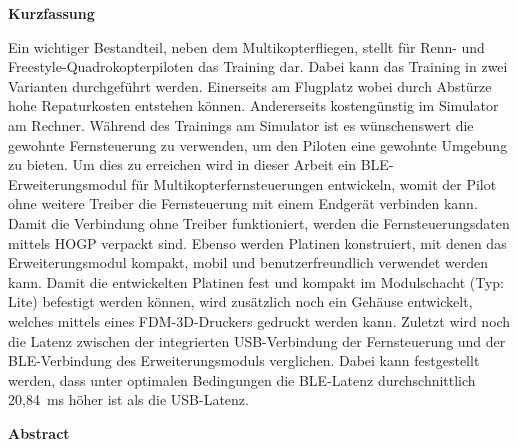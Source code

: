 
\pagestyle{empty}

\newenvironment{abstractpage}
  {\cleardoublepage\vspace*{\fill}\thispagestyle{empty}}
  {\vfill\cleardoublepage}
\newenvironment{abstractsection}[1]
  {\bigskip
   \begin{center}\bfseries#1\end{center}}
  {\par\bigskip}

\begin{abstractpage}
    \begin{abstractsection}{Kurzfassung}
      Ein wichtiger Bestandteil, neben dem Multikopterfliegen, stellt für Renn- und Freestyle-Quadrokopterpiloten das Training dar. Dabei kann das Training in zwei Varianten durchgeführt werden. Einerseits am Flugplatz wobei durch Abstürze hohe Repaturkosten entstehen können. Andererseits kostengünstig im Simulator am Rechner. Während des Trainings am Simulator ist es wünschenswert die gewohnte Fernsteuerung zu verwenden, um den Piloten eine gewohnte Umgebung zu bieten. Um dies zu erreichen wird in dieser Arbeit ein \acs{BLE}-Erweiterungsmodul für Multikopterfernsteuerungen entwickeln, womit der Pilot ohne weitere Treiber die Fernsteuerung mit einem Endgerät verbinden kann. Damit die Verbindung ohne Treiber funktioniert, werden die Fernsteuerungsdaten mittels \acs{HOGP} verpackt sind. Ebenso werden Platinen konstruiert, mit denen das Erweiterungsmodul kompakt, mobil und benutzerfreundlich verwendet werden kann. Damit die entwickelten Platinen fest und kompakt im Modulschacht (Typ: Lite) befestigt werden können, wird zusätzlich noch ein Gehäuse entwickelt, welches mittels eines \acs{FDM}-3D-Druckers gedruckt werden kann. Zuletzt wird noch die Latenz zwischen der integrierten USB-Verbindung der Fernsteuerung und der \acs{BLE}-Verbindung des Erweiterungsmoduls verglichen. Dabei kann festgestellt werden, dass unter optimalen Bedingungen die \acs{BLE}-Latenz durchschnittlich 20,84~ms höher ist als die USB-Latenz. 
    \end{abstractsection}

    \begin{abstractsection}{Abstract}
    \end{abstractsection}
\end{abstractpage}